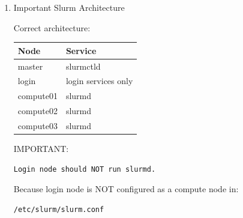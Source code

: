 \documentclass[11pt]{article}
\begin{document}
\begin{enumerate}
Verify nslcd configuration on master:

\begin{verbatim}
sudo vim /etc/nslcd.conf
\end{verbatim}

Example:

\begin{verbatim}
uid nslcd
gid ldap

uri ldap://master
base dc=hpc,dc=local
\end{verbatim}

Verify NSS configuration:

\begin{verbatim}
sudo vim /etc/nsswitch.conf
\end{verbatim}

Ensure:

\begin{verbatim}
passwd: files ldap
group: files ldap
shadow: files ldap
\end{verbatim}

Restart LDAP client:

\begin{verbatim}
sudo systemctl restart nslcd
\end{verbatim}
\item Important Slurm Architecture
\label{sec:orgae70540}

Correct architecture:

\begin{center}
\begin{tabular}{ll}
Node & Service\\
\hline
master & slurmctld\\
login & login services only\\
compute01 & slurmd\\
compute02 & slurmd\\
compute03 & slurmd\\
\end{tabular}
\end{center}

IMPORTANT:

\begin{verbatim}
Login node should NOT run slurmd.
\end{verbatim}

Because login node is NOT configured as a compute node in:

\begin{verbatim}
/etc/slurm/slurm.conf
\end{verbatim}


\end{enumerate}
\end{document}
